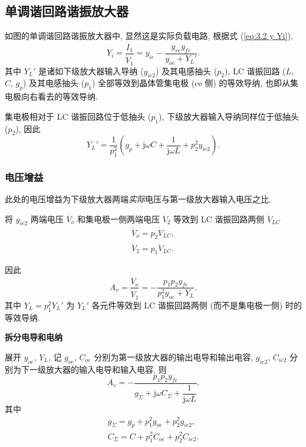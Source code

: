\subsection{单调谐回路谐振放大器} \label{3 单调谐回路谐振放大器}

如图的单调谐回路谐振放大器中, 显然这是实际负载电路, 根据式 (\ref{eq:3.2 y Yi}),
\begin{equation}
    Y_i=\frac{\dot{I}_1}{\dot{V}_1}=y_{ie}-\frac{y_{re}y_{fe}}{y_{oe}+Y_L'}.
\end{equation}
其中 $Y_L'$ 是诸如下级放大器输入导纳 ($y_{ie2}$) 及其电感抽头 ($p_2$), LC 谐振回路 ($L$, $C$, $g_p$) 及其电感抽头 ($p_1$) 全部等效到晶体管集电极 (ce 侧) 的等效导纳, 也即从集电极向右看去的等效导纳.

集电极相对于 LC 谐振回路位于低抽头 ($p_1$), 下级放大器输入导纳同样位于低抽头 ($p_2$), 因此
\begin{equation} \label{eq:3.3 Y L'}
    Y_L'=\frac{1}{p_1^2}\left(g_p+\mathrm{j}\omega C+\frac{1}{\mathrm{j}\omega L}+p_2^2y_{ie2}\right).
\end{equation}

\subsubsection{电压增益}
此处的电压增益为下级放大器两端\textit{实际}电压与第一级放大器输入电压之比.

将 $y_{ie2}$ 两端电压 $\dot{V_o}$ 和集电极一侧两端电压 $\dot{V}_{2}$ 等效到 LC 谐振回路两侧 $\dot{V}_{LC}$
\begin{gather}
    \dot{V}_o=p_2\dot{V}_{LC}, \\
    \dot{V}_2=p_1\dot{V}_{LC}.
\end{gather}

因此
\begin{equation}
    A_v=\frac{\dot{V}_o}{\dot{V}_1}=-\frac{p_1p_2y_{fe}}{p_1^2y_{oe}+Y_L}.
\end{equation}
其中 $Y_L=p_1^2Y_L'$ 为 $Y_L'$ 各元件等效到 LC 谐振回路两侧 (而不是集电极一侧) 时的等效导纳.

\textbf{拆分电导和电纳}

展开 $y_{oe}$, $Y_L$, 记 $g_{oe}$, $C_{oe}$ 分别为第一级放大器的输出电导和输出电容, $g_{ie2}$, $C_{ie2}$ 分别为下一级放大器的输入电导和输入电容, 则
\begin{equation}
    A_v=-\frac{p_1p_2y_{fe}}{g_\Sigma+\mathrm{j}\omega C_\Sigma+\dfrac{1}{\mathrm{j}\omega L}}.
\end{equation}
其中
\begin{gather}
    g_\Sigma=g_p+p_1^2g_{oe}+p_2^2g_{ie2}, \\
    C_\Sigma=C+p_1^2C_{oe}+p_2^2C_{ie2}.
\end{gather}

